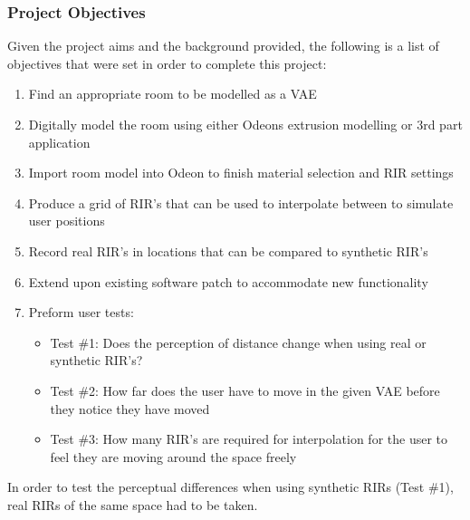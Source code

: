 \documentclass[../../main.tex]{subfiles}
\begin{document}
		\subsubsection{Project Objectives}

			Given the project aims and the background provided, the following is a list of objectives that were set in order to complete this project:

			\begin{enumerate}
				\item Find an appropriate room to be modelled as a \ac{VAE} \\
				\item Digitally model the room using either Odeons extrusion modelling or 3rd part application \\
				\item Import room model into Odeon to finish material selection and \ac{RIR} settings\\
				\item Produce a grid of \ac{RIR}'s that can be used to interpolate between to simulate user positions\\
				\item Record real \ac{RIR}'s in locations that can be compared to synthetic \ac{RIR}'s\\
				\item Extend upon existing software patch to accommodate new functionality\\
				\item Preform user tests:
					\begin{itemize}
						\item Test \#1: Does the perception of distance change when using real or synthetic \ac{RIR}'s?\\
						\item Test \#2: How far does the user have to move in the given \ac{VAE} before they notice they have moved \\
						\item Test \#3: How many \ac{RIR}'s are required for interpolation for the user to feel they are moving around the space freely\\
					\end{itemize}
				\end{enumerate}


	In order to test the perceptual differences when using synthetic RIRs (Test \#1), real RIRs of the same space had to be taken.
\end{document}
